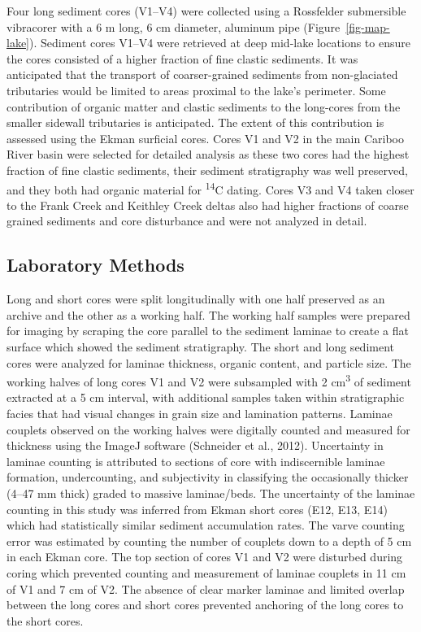 \documentclass[
  letterpaper,
  DIV=11,
  numbers=noendperiod]{scrartcl}
\begin{document}
Four long sediment cores (V1--V4) were collected using a Rossfelder
submersible vibracorer with a 6 m long, 6 cm diameter, aluminum pipe
(Figure~\ref{fig-map-lake}). Sediment cores V1--V4 were retrieved at
deep mid-lake locations to ensure the cores consisted of a higher
fraction of fine clastic sediments. It was anticipated that the
transport of coarser-grained sediments from non-glaciated tributaries
would be limited to areas proximal to the lake's perimeter. Some
contribution of organic matter and clastic sediments to the long-cores
from the smaller sidewall tributaries is anticipated. The extent of this
contribution is assessed using the Ekman surficial cores. Cores V1 and
V2 in the main Cariboo River basin were selected for detailed analysis
as these two cores had the highest fraction of fine clastic sediments,
their sediment stratigraphy was well preserved, and they both had
organic material for \textsuperscript{14}C dating. Cores V3 and V4 taken
closer to the Frank Creek and Keithley Creek deltas also had higher
fractions of coarse grained sediments and core disturbance and were not
analyzed in detail.

\hypertarget{laboratory-methods}{%
\subsection{Laboratory Methods}\label{laboratory-methods}}

Long and short cores were split longitudinally with one half preserved
as an archive and the other as a working half. The working half samples
were prepared for imaging by scraping the core parallel to the sediment
laminae to create a flat surface which showed the sediment stratigraphy.
The short and long sediment cores were analyzed for laminae thickness,
organic content, and particle size. The working halves of long cores V1
and V2 were subsampled with 2 cm\textsuperscript{3} of sediment
extracted at a 5 cm interval, with additional samples taken within
stratigraphic facies that had visual changes in grain size and
lamination patterns. Laminae couplets observed on the working halves
were digitally counted and measured for thickness using the ImageJ
software (Schneider et al., 2012). Uncertainty in laminae counting is
attributed to sections of core with indiscernible laminae formation,
undercounting, and subjectivity in classifying the occasionally thicker
(4--47 mm thick) graded to massive laminae/beds. The uncertainty of the
laminae counting in this study was inferred from Ekman short cores (E12,
E13, E14) which had statistically similar sediment accumulation rates.
The varve counting error was estimated by counting the number of
couplets down to a depth of 5 cm in each Ekman core. The top section of
cores V1 and V2 were disturbed during coring which prevented counting
and measurement of laminae couplets in 11 cm of V1 and 7 cm of V2. The
absence of clear marker laminae and limited overlap between the long
cores and short cores prevented anchoring of the long cores to the short
cores.
\end{document}
